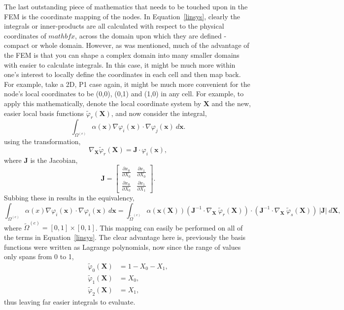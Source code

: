 The last outstanding piece of mathematics that needs to be touched upon in the FEM is the coordinate mapping of the nodes. In Equation~\ref{linsys}, clearly the integrals or inner-products are all calculated with respect to the physical coordinates of $mathbf{x}$, across the domain upon which they are defined - compact or whole domain. However, as was mentioned, much of the advantage of the FEM is that you can shape a complex domain into many smaller domains with easier to calculate integrals. In this case, it might be much more within one's interest to locally define the coordinates in each cell and then map back. For example, take a 2D, P1 case again, it might be much more convenient for the node's local coordinates to be (0,0), (0,1) and (1,0) in any cell. For example, to apply this mathematically, denote the local coordinate system by $\mathbf{X}$ and the new, easier local basis functions $\widetilde\varphi_r(\mathbf{X})$, and now consider the integral,
\begin{equation}
	\int_{\Omega^{(e)}} \alpha(\mathbf{x})\nabla \varphi_i(\mathbf{x}) \cdot \nabla \varphi_j(\mathbf{x})~d\mathbf{x}.
\end{equation}
using the transformation,
\begin{equation}
	\nabla_\mathbf{X}\widetilde\varphi_r(\mathbf{X}) = \mathbf{J}\cdot \varphi_i(\mathbf{x}),
\end{equation}
where $\mathbf{J}$ is the Jacobian,
\begin{equation}
	\mathbf{J} =
	\left[\begin{matrix}
		\frac{\partial x_0}{\partial X_0} & \frac{\partial x_1}{\partial X_0}\\
		\frac{\partial x_0}{\partial X_0} & \frac{\partial x_1}{\partial X_1}
	\end{matrix}\right].
\end{equation}
Subbing these in results in the equivalency,
\begin{equation}
	\int_{\Omega^{(e)}} \alpha(x)\nabla \varphi_i(\mathbf{x}) \cdot \nabla \varphi_i(\mathbf{x})~d\mathbf{x} = \int_{\widetilde{\Omega}^{(e)}} \alpha(\mathbf{x}(\mathbf{X}))(\mathbf{J}^{-1}\cdot\nabla_\mathbf{X}~\widetilde\varphi_r(\mathbf{X}) )\cdot(\mathbf{J}^{-1}\cdot\nabla_\mathbf{X}~\widetilde\varphi_s(\mathbf{X}))~\vert\mathbf{J}\vert~d\mathbf{X},
\end{equation}
where ${\widetilde{\Omega}^{(e)}} = [0,1]\times[0,1]$. This mapping can easily be performed on all of the terms in Equation~\eqref{linsys}. The clear advantage here is, previously the basis functions were written as Lagrange polynomials, now since the range of values only spans from 0 to 1,
\begin{align}
	\widetilde\varphi_0(\mathbf{X}) &= 1 - X_0 - X_1,\\
	\widetilde\varphi_1(\mathbf{X}) &= X_0,\\
	\widetilde\varphi_2(\mathbf{X}) &= X_1,
\end{align}
thus leaving far easier integrals to evaluate.

